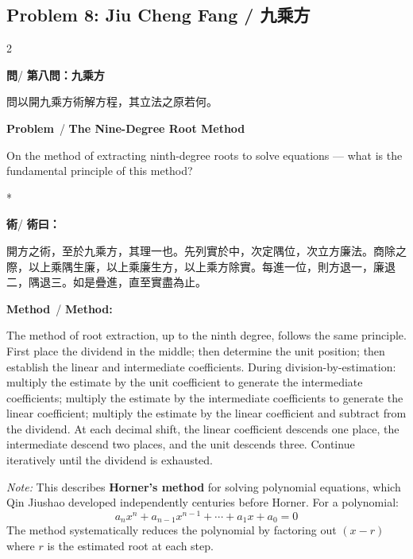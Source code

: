 \documentclass[11pt,a4paper]{article}
\newcommand{\wen}{\textbf{\color{sectioncolor}問}}
\newcommand{\shu}{\textbf{\color{methodcolor}術}}
\newcommand{\prb}{\textbf{\color{sectioncolor}Problem}}
\newcommand{\meth}{\textbf{\color{methodcolor}Method}}
\begin{document}
\subsection*{Problem 8: Jiu Cheng Fang / 九乘方}

\begin{paracol}{2}

\begin{leftcolumn*}
\wen / \textbf{第八問：九乘方}

問以開九乘方術解方程，其立法之原若何。
\end{leftcolumn*}

\begin{rightcolumn}
\prb\ / \textbf{The Nine-Degree Root Method}

On the method of extracting ninth-degree roots to 
solve equations --- what is the fundamental principle of this method?
\end{rightcolumn}

\switchcolumn[0]*

\begin{leftcolumn*}
\shu / \textbf{術曰：}

開方之術，至於九乘方，其理一也。先列實於中，次定隅位，次立方廉法。商除之際，以上乘隅生廉，以上乘廉生方，以上乘方除實。每進一位，則方退一，廉退二，隅退三。如是疊進，直至實盡為止。
\end{leftcolumn*}

\begin{rightcolumn}
\meth\ / \textbf{Method:}

The method of root extraction, up to the ninth degree, 
follows the same principle. First place the dividend in the middle; 
then determine the unit position; then establish the linear and 
intermediate coefficients. During division-by-estimation: multiply the 
estimate by the unit coefficient to generate the intermediate 
coefficients; multiply the estimate by the intermediate coefficients to 
generate the linear coefficient; multiply the estimate by the linear 
coefficient and subtract from the dividend. At each decimal shift, the 
linear coefficient descends one place, the intermediate descend two 
places, and the unit descends three. Continue iteratively until the 
dividend is exhausted.

\medskip
\textit{Note:} This describes \textbf{Horner's method} for solving polynomial 
equations, which Qin Jiushao developed independently centuries before 
Horner. For a polynomial:
\[
a_n x^n + a_{n-1} x^{n-1} + \cdots + a_1 x + a_0 = 0
\]
The method systematically reduces the polynomial by factoring out 
$(x - r)$ where $r$ is the estimated root at each step.
\end{rightcolumn}

\end{paracol}
\end{document}
